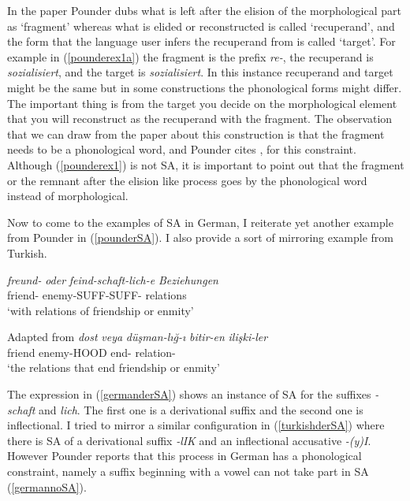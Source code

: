 In the paper Pounder dubs what is left after the elision of the morphological part as `fragment' whereas what is elided or reconstructed is called `recuperand', and the form that the language user infers the recuperand from is called `target'. For example in (\ref{pounderex1a}) the fragment is the prefix \textit{re-}, the recuperand is \textit{sozialisiert}, and the target is \textit{sozialisiert}. In this instance recuperand and target might be the same but in some constructions the phonological forms might differ. The important thing is from the target you decide on the morphological element that you will reconstruct as the recuperand with the fragment. The observation that we can draw from the paper about this construction is that the fragment needs to be a phonological word, and Pounder cites \cite{smith2000word},  for this constraint. Although (\ref{pounderex1}) is not SA, it is important to point out that the fragment or the remnant after the elision like process goes by the phonological word instead of morphological. 

Now to come to the examples of SA in German, I reiterate yet another example from Pounder in (\ref{pounderSA}). I also provide a sort of mirroring example from Turkish.

\begin{exe}
    \ex \label{pounderSA}
    \begin{xlist}
        \ex \label{germanderSA}
        \gll 
        \textit{freund-} \textit{oder} \textit{feind-schaft-lich-e} \textit{Beziehungen} \\ friend- {\Or} enemy-SUFF-SUFF-{\Pl} relations \\
        \glt `with relations of friendship or enmity'
        
        \hfill Adapted from \cite{pounder2006broken}
        \ex \label{turkishderSA} 
        \gll 
        \textit{dost} \textit{veya} \textit{düşman-lığ-ı} \textit{bitir-en} \textit{ilişki-ler} \\ friend {\Or} enemy-HOOD end-{\Fp} relation-{\Pl} \\
        \glt `the relations that end friendship or enmity'
    \end{xlist}
\end{exe}

The expression in (\ref{germanderSA}) shows an instance of SA for the suffixes \textit{-schaft} and \textit{lich}. The first one is a derivational suffix and the second one is inflectional. I tried to mirror a similar configuration in (\ref{turkishderSA}) where there is SA of a derivational suffix \textit{-lIK} and an inflectional accusative \textit{-(y)I}. However Pounder reports that this process in German has a phonological constraint, namely a suffix beginning with a vowel can not take part in SA (\ref{germannoSA}).

